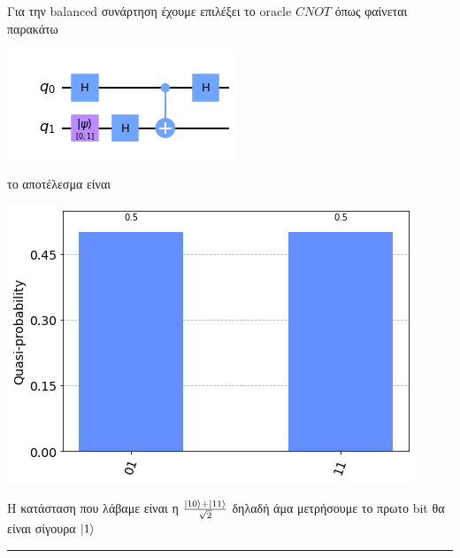 \documentclass[12pt]{article}
\begin{document}
Για την \textlatin{balanced} συνάρτηση έχουμε επιλέξει το \textlatin{oracle} $CNOT$ όπως φαίνεται παρακάτω
\begin{center}
    \includegraphics[]{balancedoracle.png}
    \end{center}
το αποτέλεσμα είναι
\begin{center}
    \includegraphics[]{secondhisto.png}
\end{center}
H κατάσταση που λάβαμε είναι η $\frac{\ket{10}+\ket{11}}{\sqrt{2}}$  δηλαδή άμα μετρήσουμε το πρωτο \textlatin{bit} θα είναι σίγουρα $\ket{1}$\\
\rule{\textwidth}{.5pt}
\end{document}
